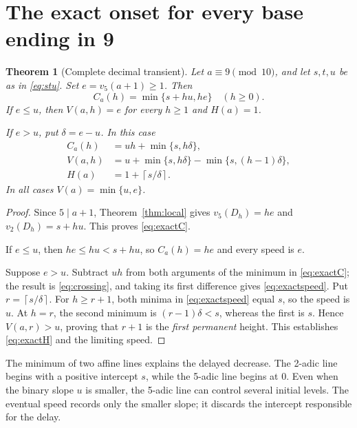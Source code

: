 \documentclass[11pt,letterpaper]{article}
\numberwithin{equation}{section}
\newtheorem{theorem}{Theorem}[section]
\theoremstyle{definition}
\theoremstyle{remark}
\newcommand{\ceil}[1]{\left\lceil #1\right\rceil}
\begin{document}
\section{The exact onset for every base ending in 9}\label{sec:onset}

\begin{theorem}[Complete decimal transient]\label{thm:onset}
Let $a\equiv9\pmod{10}$, and let $s,t,u$ be as in \eqref{eq:stu}. Set $e=v_5(a+1)\ge1$. Then
\begin{equation}\label{eq:exactC}
 \boxed{\ C_a(h)=\min\{s+hu,he\}\quad(h\ge0).\ }
\end{equation}
If $e\le u$, then $V(a,h)=e$ for every $h\ge1$ and $H(a)=1$.

If $e>u$, put $\delta=e-u$. In this case
\begin{align}
 C_a(h)&=uh+\min\{s,h\delta\},\label{eq:crossing}\\
 V(a,h)&=u+\min\{s,h\delta\}-\min\{s,(h-1)\delta\},\label{eq:exactspeed}\\
 H(a)&=1+\ceil{s/\delta}.\label{eq:exactH}
\end{align}
In all cases $V(a)=\min\{u,e\}$.
\end{theorem}
\begin{proof}
Since $5\mid a+1$, Theorem~\ref{thm:local} gives $v_5(D_h)=he$ and $v_2(D_h)=s+hu$. This proves \eqref{eq:exactC}.

If $e\le u$, then $he\le hu<s+hu$, so $C_a(h)=he$ and every speed is $e$.

Suppose $e>u$. Subtract $uh$ from both arguments of the minimum in \eqref{eq:exactC}; the result is \eqref{eq:crossing}, and taking its first difference gives \eqref{eq:exactspeed}. Put $r=\ceil{s/\delta}$. For $h\ge r+1$, both minima in \eqref{eq:exactspeed} equal $s$, so the speed is $u$. At $h=r$, the second minimum is $(r-1)\delta<s$, whereas the first is $s$. Hence $V(a,r)>u$, proving that $r+1$ is the \emph{first permanent} height. This establishes \eqref{eq:exactH} and the limiting speed.
\end{proof}

The minimum of two affine lines explains the delayed decrease. The 2-adic line begins with a positive intercept $s$, while the 5-adic line begins at $0$. Even when the binary slope $u$ is smaller, the 5-adic line can control several initial levels. The eventual speed records only the smaller slope; it discards the intercept responsible for the delay.
\end{document}
